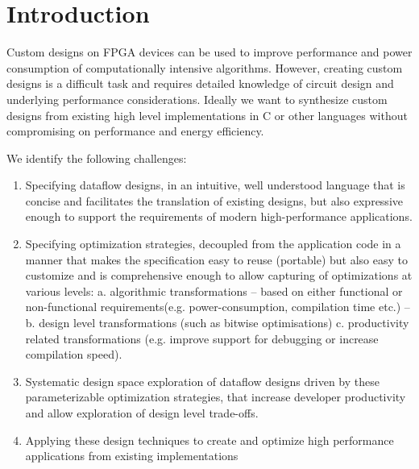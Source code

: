 \section{Introduction}

Custom designs on FPGA devices can be used to improve performance and
power consumption of computationally intensive algorithms. However,
creating custom designs is a difficult task and requires detailed
knowledge of circuit design and underlying performance
considerations. Ideally we want to synthesize custom designs from
existing high level implementations in C or other languages without
compromising on performance and energy efficiency.

We identify the following challenges:
\begin{enumerate}
\item Specifying dataflow designs, in an intuitive, well understood
  language that is concise and facilitates the translation of existing
  designs, but also expressive enough to support the requirements of
  modern high-performance applications.
\item Specifying optimization strategies, decoupled from the
  application code in a manner that makes the specification easy to
  reuse (portable) but also easy to customize and is comprehensive
  enough to allow capturing of optimizations at various levels:
  a. algorithmic transformations -- based on either functional or
  non-functional requirements(e.g. power-consumption, compilation time
  etc.) -- b. design level transformations (such as bitwise
  optimisations) c. productivity related transformations (e.g. improve
  support for debugging or increase compilation speed).
\item Systematic design space exploration of dataflow designs driven
  by these parameterizable optimization strategies, that increase
  developer productivity and allow exploration of design level
  trade-offs.
\item Applying these design techniques to create and optimize high
  performance applications from existing implementations
\end{enumerate}

